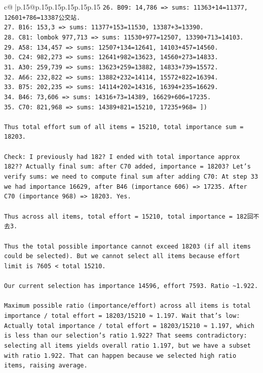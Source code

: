 \documentclass{article}
\begin{document}
{\begin{supertabular}{c@{$\;$}|p{.15\linewidth}@{}p{.15\linewidth}p{.15\linewidth}p{.15\linewidth}p{.15\linewidth}p{.15\linewidth}}
{{{\texttt{26. B09: 14,786 => sums: 11363+14=11377, 12601+786=13387公交站.} \\
\texttt{27. B16: 153,3 => sums: 11377+153=11530, 13387+3=13390.} \\
\texttt{28. C81: lombok 977,713 => sums: 11530+977=12507, 13390+713=14103.} \\
\texttt{29. A58: 134,457 => sums: 12507+134=12641, 14103+457=14560.} \\
\texttt{30. C24: 982,273 => sums: 12641+982=13623, 14560+273=14833.} \\
\texttt{31. A30: 259,739 => sums: 13623+259=13882, 14833+739=15572.} \\
\texttt{32. A66: 232,822 => sums: 13882+232=14114, 15572+822=16394.} \\
\texttt{33. B75: 202,235 => sums: 14114+202=14316, 16394+235=16629.} \\
\texttt{34. B46: 73,606 => sums: 14316+73=14389, 16629+606=17235.} \\
\texttt{35. C70: 821,968 => sums: 14389+821=15210, 17235+968= {]})} \\
\\ 
\texttt{Thus total effort sum of all items = 15210, total importance sum = 18203.} \\
\\ 
\texttt{Check: I previously had 182? I ended with total importance approx 182?? Actually final sum: after C70 added, importance = 18203? Let's verify sums: we need to compute final sum after adding C70: At step 33 we had importance 16629, after B46 (importance 606) => 17235. After C70 (importance 968) => 18203. Yes.} \\
\\ 
\texttt{Thus across all items, total effort = 15210, total importance = 182回不去3.} \\
\\ 
\texttt{Thus the total possible importance cannot exceed 18203 (if all items could be selected). But we cannot select all items because effort limit is 7605 < total 15210.} \\
\\ 
\texttt{Our current selection has importance 14596, effort 7593. Ratio \textasciitilde{}1.922.} \\
\\ 
\texttt{Maximum possible ratio (importance/effort) across all items is total importance / total effort = 18203/15210 ≈ 1.197. Wait that's low: Actually total importance / total effort = 18203/15210 ≈ 1.197, which is less than our selection's ratio 1.922? That seems contradictory: selecting all items yields overall ratio 1.197, but we have a subset with ratio 1.922. That can happen because we selected high ratio items, raising average.} \\
}}}
\end{supertabular}}
\end{document}
